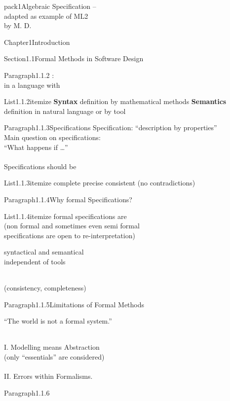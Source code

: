 \documentclass[landscape, slides, light]{mmiss2}
\begin{document}
\begin{Package}{pack1}{Algebraic
Specification -- \\ adapted as example of ML2\\ by M. D.}
\begin{Section}{Chapter1}{Introduction}
\begin{Section}{Section1.1}{Formal Methods in Software Design}{}
\begin{Paragraph}{Paragraph1.1.2}{}{}
: \\
in a language with
\begin{List}{List1.1.2}{itemize}{}
\ListItem{}
 {{\bf Syntax} definition by mathematical methods}
\ListItem{} 
{{\bf Semantics} definition in natural language or by tool}
\end{List}
\end{Paragraph}

\begin{Paragraph}{Paragraph1.1.3}{Specifications}{}
Specification: ``description by properties''\\

Main question on specifications:\\
``What happens if \dots'' \\ \\

Specifications should be \pause
\begin{List}{List1.1.3}{itemize}{}
\ListItem{}
{complete \pause}
\ListItem{}
{precise \pause}
\ListItem{}
{consistent (no contradictions)}
\end{List}
\end{Paragraph}
\begin{Paragraph}{Paragraph1.1.4}{Why formal Specifications?}{}
\begin{List}{List1.1.4}{itemize}{}
\ListItem{}
{formal specifications are   \\
          (non formal and sometimes even semi formal \\
          specifications are open to re-interpretation)\pause}


\ListItem{}
{syntactical and semantical  \\
          independent of tools \pause}

\ListItem{}
{ \\
          (consistency, completeness)}
\end{List}
\end{Paragraph}
\begin{Paragraph}{Paragraph1.1.5}{Limitations of Formal Methods}{}
\begin{center}
``The world is not a formal system.''
\end{center}
\hfill \\
I. Modelling means Abstraction \\
(only ``essentials'' are considered)\\
\hfill \\
II. Errors within Formalisms.
\end{Paragraph}
\begin{Paragraph}{Paragraph1.1.6}{}{}


\end{Paragraph}
\end{Section}
\end{Section}
\end{Package}
\end{document}

